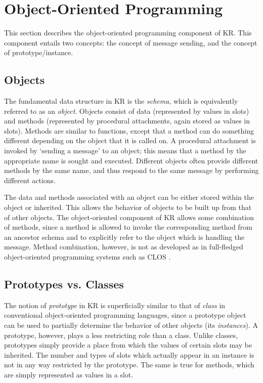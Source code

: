 \chapter{Object-Oriented Programming}
\label{object-oriented-prog}
\value{top}


This section describes the object-oriented programming component of KR.
 This component entails two concepts:
the concept of message sending, and the concept of prototype/instance.

\section{Objects}

The fundamental data structure in KR is the {\it schema}, which is equivalently
referred to as an {\it object}.  Objects consist of data
(represented by values in slots) and methods (represented by
procedural attachments, again stored as values in slots).  Methods are
similar to functions, except that a method can do something different
depending on the object that it is called on.
A procedural attachment is invoked by `sending a
message' to an object; this means that a method by the
appropriate name is sought and executed.  Different objects often
provide different methods by the same name, and thus respond to the
same message by performing different actions.

The data and methods associated with an object can be either stored
within the object or inherited.  This allows the behavior of objects
to be built up from that of other objects.  The object-oriented
component of KR allows some combination of methods, since a method is allowed to invoke the corresponding
method from an ancestor schema and to explicitly refer to the object
which is handling the message.  Method combination, however, is not as
developed as in full-fledged object-oriented programming systems such
as CLOS \cite{CLOS-X3J13}.


\section{Prototypes vs. Classes}

The notion of  {\it prototype}
 in KR is superficially similar to that of {\it class} in
conventional object-oriented programming languages, since a prototype
object can be used to partially determine the behavior of other
objects (its {\it instances}).  A prototype, however,
plays a less restricting role than a class.  Unlike classes,
prototypes simply provide a place from which the values of certain
slots may be inherited.  The number and types of slots which actually
appear in an instance is not in any way restricted by the
prototype.  The same is true for
methods, which are simply represented as values in a slot.

